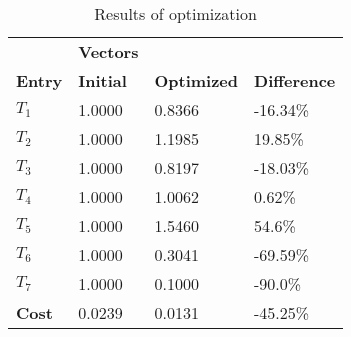 \begin{table}[H]
\centering
\begin{tabular}{llll}
\textbf{}      & \cellcolor[HTML]{EFEFEF}\textbf{Vectors} & \textbf{} & \textbf{}         \\
\rowcolor[HTML]{EFEFEF} 
\textbf{Entry} & \textbf{Initial} & \textbf{Optimized} & \textbf{Difference} \\
$T_1$ & 1.0000 & 0.8366 & -16.34\% \\ 
$T_2$ & 1.0000 & 1.1985 & 19.85\% \\ 
$T_3$ & 1.0000 & 0.8197 & -18.03\% \\ 
$T_4$ & 1.0000 & 1.0062 & 0.62\% \\ 
$T_5$ & 1.0000 & 1.5460 & 54.6\% \\ 
$T_6$ & 1.0000 & 0.3041 & -69.59\% \\ 
$T_7$ & 1.0000 & 0.1000 & -90.0\% \\ 
\rowcolor[HTML]{EFEFEF} 
\textbf{Cost}  & 0.0239 & 0.0131 & -45.25\% \\ 
\end{tabular}
\caption{Results of optimization}
\label{tab:OptimizationAnalysis}
\end{table}